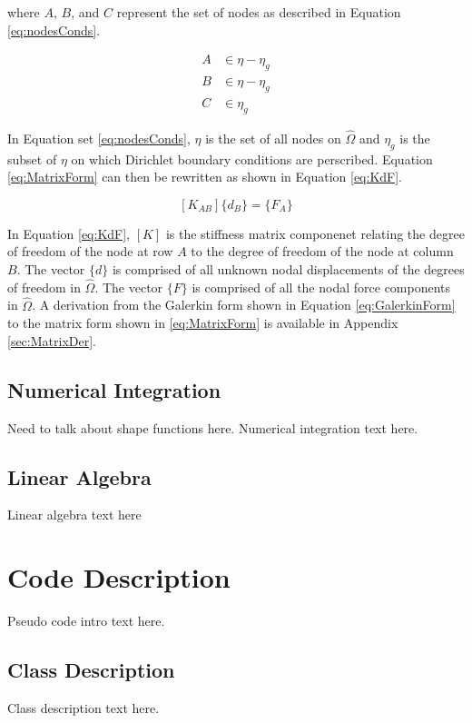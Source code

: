 \documentclass[a4paper, 12pt]{article}
\begin{document}
\noindent 
where $A$, $B$, and $C$ represent the set of nodes as described in 
Equation \ref{eq:nodesConds}.

\begin{align}
A &\in \eta - \eta_g
  \nonumber         \\
B &\in \eta - \eta_g
  \nonumber         \\
C &\in \eta_g
  \label{eq:nodesConds}
\end{align}

\noindent
In Equation set \ref{eq:nodesConds}, $\eta$ is the set of all nodes on $\hat{\Omega}$ 
and $\eta_g$ is the subset of $\eta$ on which Dirichlet boundary conditions are 
perscribed. Equation \ref{eq:MatrixForm} can then be rewritten as shown in
Equation \ref{eq:KdF}.

\begin{equation} \label{eq:KdF}
[ K_{AB} ] \{ d_B \} = \{ F_A \} 
\end{equation}

\noindent
In Equation \ref{eq:KdF}, $[K]$ is the stiffness matrix componenet 
relating the degree of freedom of the node at row $A$ to the degree of freedom 
of the node at column $B$. The vector $\{d\}$ is comprised of all unknown 
nodal displacements of the degrees of freedom in $\hat{\Omega}$. The 
vector $\{F\}$ is comprised of all the nodal force components in $\hat{\Omega}$.
A derivation from the Galerkin form shown in Equation \ref{eq:GalerkinForm}
to the matrix form shown in \ref{eq:MatrixForm} is available in Appendix
\ref{sec:MatrixDer}. 

\subsection{Numerical Integration} \label{subsec:numInt}
Need to talk about shape functions here.
Numerical integration text here.

\subsection{Linear Algebra} \label{subsec:LinAlg}
Linear algebra text here

\section{Code Description} \label{sec:codeDes}
Pseudo code intro text here.

\subsection{Class Description} \label{subsec:class}
Class description text here.
\end{document}
